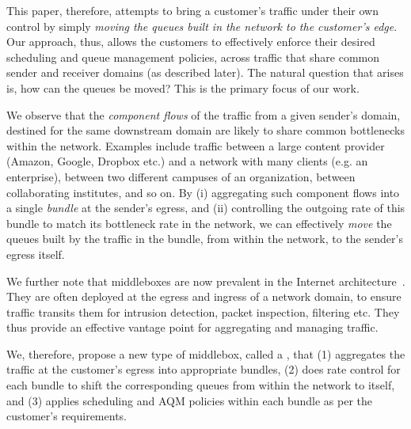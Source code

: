 This paper, therefore, attempts to bring a customer's traffic under their own control by simply \emph{moving the queues built in the network to the customer's edge}. Our approach, thus, allows the customers to effectively enforce their desired scheduling and queue management policies, across traffic that share common sender and receiver domains (as described later). The natural question that arises is, how can the queues be moved? This is the primary focus of our work. 

We observe that the \emph{component flows} of the traffic from a given sender's domain, destined for the same downstream domain are likely to share common bottlenecks within the network. Examples include traffic between a large content provider (\eg Amazon, Google, Dropbox etc.) and a network with many clients (e.g. an enterprise), between two different campuses of an organization, between collaborating institutes, and so on. By (i) aggregating such component flows into a single \emph{bundle} at the sender's egress, and (ii) controlling the outgoing rate of this bundle to match its bottleneck rate in the network, we can effectively \emph{move} the queues built by the traffic in the bundle, from within the network, to the sender's egress itself. 

We further note that middleboxes are now prevalent in the Internet architecture~\cite{aplomb}. They are often deployed at the egress and ingress of a network domain, to ensure traffic transits them for intrusion detection, packet inspection, filtering etc. They thus provide an effective vantage point for aggregating and managing traffic. 

We, therefore, propose a new type of middlebox, called a \name, that (1) aggregates the traffic at the customer's egress into appropriate bundles, (2) does rate control for each bundle to shift the corresponding queues from within the network to itself, and (3) applies scheduling and AQM policies within each bundle as per the customer's requirements. 

